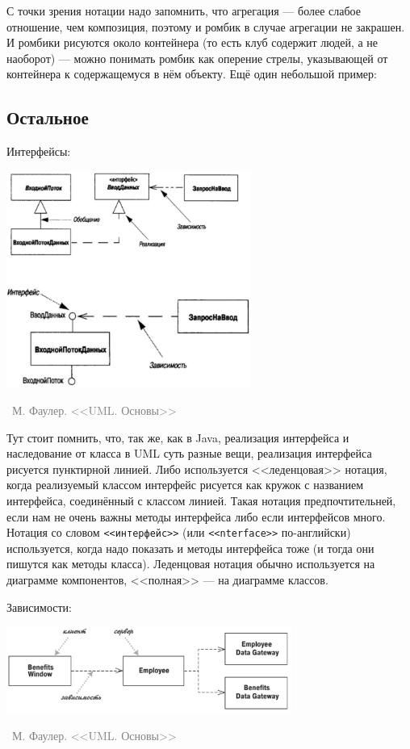 \documentclass[a5paper]{article}
\newcommand{\attribution}[1] {
    \vspace{-5mm}\begin{flushright}\begin{scriptsize}\textcolor{gray}{\textcopyright\, #1}\end{scriptsize}\end{flushright}
}
\begin{document}
С точки зрения нотации надо запомнить, что агрегация --- более слабое отношение, чем композиция, поэтому и ромбик в случае агрегации не закрашен. И ромбики рисуются около контейнера (то есть клуб содержит людей, а не наоборот) --- можно понимать ромбик как оперение стрелы, указывающей от контейнера к содержащемуся в нём объекту. Ещё один небольшой пример:

\subsection{Остальное}

Интерфейсы: 

\begin{center}
    \includegraphics[width=0.6\textwidth]{interfaces.png}
    \attribution{М. Фаулер. <<UML. Основы>>}
\end{center}

Тут стоит помнить, что, так же, как в Java, реализация интерфейса и наследование от класса в UML суть разные вещи, реализация интерфейса рисуется пунктирной линией. Либо используется <<леденцовая>> нотация, когда реализуемый классом интерфейс рисуется как кружок с названием интерфейса, соединённый с классом линией. Такая нотация предпочтительней, если нам не очень важны методы интерфейса либо если интерфейсов много. Нотация со словом \verb|<<интерфейс>>| (или \verb|<<nterface>>| по-английски) используется, когда надо показать и методы интерфейса тоже (и тогда они пишутся как методы класса). Леденцовая нотация обычно используется на диаграмме компонентов, <<полная>> --- на диаграмме классов.

Зависимости:

\begin{center}
    \includegraphics[width=0.7\textwidth]{dependencies.png}
    \attribution{М. Фаулер. <<UML. Основы>>}
\end{center}
\end{document}
